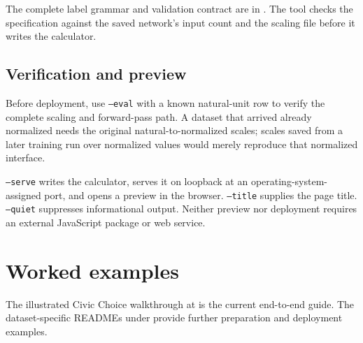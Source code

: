 The complete label grammar and validation contract are in
.  The tool checks the specification against the
saved network's input count and the scaling file before it writes the
calculator.

\subsection{Verification and preview}

Before deployment, use \texttt{--eval} with a known natural-unit row
to verify the complete scaling and forward-pass path.  A dataset that
arrived already normalized needs the original natural-to-normalized
scales; scales saved from a later training run over normalized values
would merely reproduce that normalized interface.

\texttt{--serve} writes the calculator, serves it on loopback at an
operating-system-assigned port, and opens a preview in the browser.
\texttt{--title} supplies the page title.  \texttt{--quiet}
suppresses informational output.  Neither preview nor deployment
requires an external JavaScript package or web service.

\section{Worked examples}

The illustrated Civic Choice walkthrough at
 is the current
end-to-end guide.  The dataset-specific READMEs under
 provide further preparation and deployment
examples.
